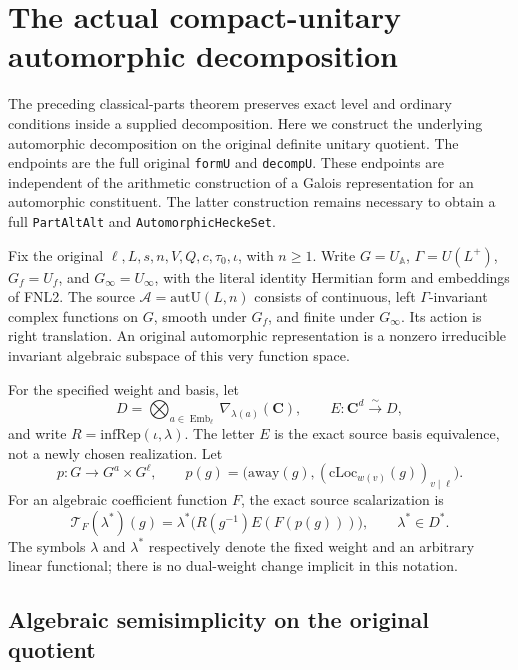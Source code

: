 \section{The actual compact-unitary automorphic decomposition}
\label{sec:automorphic-decomposition-v43}

The preceding classical-parts theorem preserves exact level and ordinary
conditions inside a supplied decomposition.  Here we construct the
underlying automorphic decomposition on the original definite unitary
quotient.  The endpoints are the full original \texttt{formU} and
\texttt{decompU}.  These endpoints are independent of the arithmetic
construction of a Galois representation for an automorphic constituent.
The latter construction remains necessary to obtain a full
\texttt{PartAltAlt} and \texttt{AutomorphicHeckeSet}.

Fix the original \(\ell,L,s,n,V,Q,c,\tau_0,\iota\), with
\(n\ge1\).  Write \(G=U_{\mathbb A}\),
\(\Gamma=U(L^+)\), \(G_f=U_f\), and \(G_\infty=U_\infty\),
with the literal identity Hermitian form and embeddings of FNL2.  The
source \(\mathcal A=\mathrm{autU}(L,n)\) consists of continuous,
left \(\Gamma\)-invariant complex functions on \(G\), smooth under
\(G_f\), and finite under \(G_\infty\).  Its action is right
translation.  An original automorphic representation is a nonzero
irreducible invariant algebraic subspace of this very function space.

For the specified weight and basis, let
\[
 D=\bigotimes_{a\in\operatorname{Emb}_\ell}
             \nabla_{\lambda(a)}(\mathbf C),\qquad
 E:\mathbf C^d\xrightarrow{\sim}D,
\]
and write \(R=\mathrm{infRep}(\iota,\lambda)\).  The letter \(E\)
is the exact source basis equivalence, not a newly chosen realization.
Let
\[
 p:G\longrightarrow G^a\times G^\ell,
 \qquad
 p(g)=\bigl(\mathrm{away}(g),(\mathrm{cLoc}_{w(v)}(g))_{v\mid\ell}\bigr).
\]
For an algebraic coefficient function \(F\), the exact source scalarization is
\begin{equation}\label{eq:adp-toform}
 \mathcal T_F(\lambda^*)(g)
       =\lambda^*\bigl(R(g^{-1})E(F(p(g)))\bigr),\qquad
                  \lambda^*\in D^*.
\end{equation}
The symbols \(\lambda\) and \(\lambda^*\) respectively denote the fixed
weight and an arbitrary linear functional; there is no dual-weight change
implicit in this notation.

\subsection{Algebraic semisimplicity on the original quotient}

